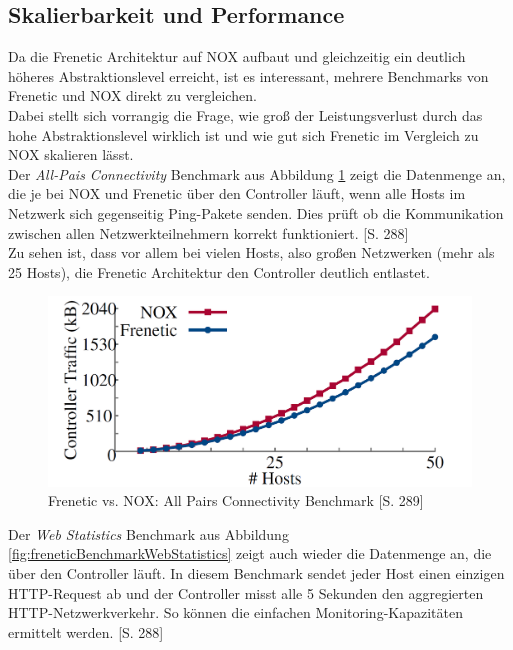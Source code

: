 \documentclass[10pt,conference]{IEEEtran}
\begin{document}
\subsection{Skalierbarkeit und Performance}
Da die Frenetic Architektur auf NOX aufbaut und gleichzeitig ein deutlich höheres Abstraktionslevel erreicht, ist es interessant, mehrere Benchmarks von Frenetic und NOX direkt zu vergleichen.\\
Dabei stellt sich vorrangig die Frage, wie groß der Leistungsverlust durch das hohe Abstraktionslevel wirklich ist und wie gut sich Frenetic im Vergleich zu NOX skalieren lässt.\\
\newline
Der \textit{All-Pais Connectivity} Benchmark aus Abbildung \ref{fig:freneticBenchmarkAllPairsConnectivity} zeigt die Datenmenge an, die je bei NOX und Frenetic über den Controller läuft, wenn alle Hosts im Netzwerk sich gegenseitig Ping-Pakete senden. Dies prüft ob die Kommunikation zwischen allen Netzwerkteilnehmern korrekt funktioniert. \cite{4}[S. 288]\\
Zu sehen ist, dass vor allem bei vielen Hosts, also großen Netzwerken (mehr als 25 Hosts), die Frenetic Architektur den Controller deutlich entlastet.
\begin{figure}[h]
	\centering
	\includegraphics[width=\columnwidth]{images/freneticBenchmarkAllPairsConnectivity.PNG}
	\caption{Frenetic vs. NOX: All Pairs Connectivity Benchmark \cite{4}[S. 289]}
	\label{fig:freneticBenchmarkAllPairsConnectivity}
\end{figure}
\newline
Der \textit{Web Statistics} Benchmark aus Abbildung \ref{fig:freneticBenchmarkWebStatistics} zeigt auch wieder die Datenmenge an, die über den Controller läuft. In diesem Benchmark sendet jeder Host einen einzigen HTTP-Request ab und der Controller misst alle 5 Sekunden den aggregierten HTTP-Netzwerkverkehr. So können die einfachen Monitoring-Kapazitäten ermittelt werden. \cite{4}[S. 288]\\
\end{document}
